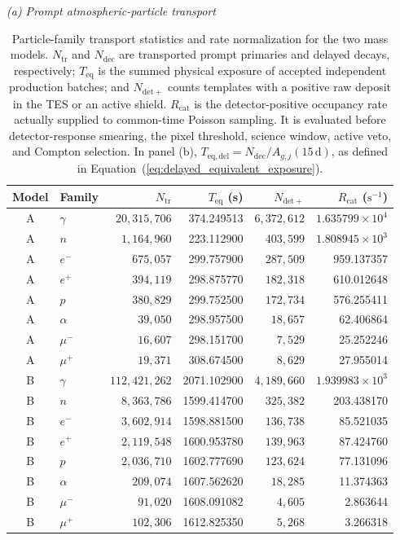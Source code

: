 \documentclass[11pt]{article}
\begin{document}
\begin{table}[!htbp]

\centering

\caption{Particle-family transport statistics and rate
normalization for the two mass models. $N_{\mathrm{tr}}$ and $N_{\mathrm{dec}}$
are transported prompt primaries and delayed decays, respectively;
$T_{\mathrm{eq}}$ is the summed physical exposure of accepted independent
production batches; and $N_{\mathrm{det+}}$ counts templates with a positive
raw deposit in the TES or an active shield. $R_{\mathrm{cat}}$ is the
detector-positive occupancy rate actually supplied to common-time Poisson
sampling. It is evaluated before detector-response smearing, the pixel
threshold, science window, active veto, and Compton selection. In panel (b),
$T_{\mathrm{eq,del}}=N_{\mathrm{dec}}/A_{g,j}(15\,\mathrm d)$, as defined in
Equation~(\ref{eq:delayed_equivalent_exposure}).}
\label{tab:background_source_model}
\scriptsize
\setlength{\tabcolsep}{5.0pt}
\renewcommand{\arraystretch}{0.92}
\noindent\textit{(a) Prompt atmospheric-particle transport}\par\vspace{0.20em}
\begin{tabular}{clrrrr}
\toprule
Model & Family & $N_{\mathrm{tr}}$ & $T_{\mathrm{eq}}$ (s)
& $N_{\mathrm{det+}}$ & $R_{\mathrm{cat}}$ ($\mathrm{s^{-1}}$) \\
\midrule
A & $\gamma$ & $20{,}315{,}706$ & 374.249513 & $6{,}372{,}612$ & $1.635799\times10^{4}$ \\
A & $n$ & $1{,}164{,}960$ & 223.112900 & $403{,}599$ & $1.808945\times10^{3}$ \\
A & $e^-$ & $675{,}057$ & 299.757900 & $287{,}509$ & 959.137357 \\
A & $e^+$ & $394{,}119$ & 298.875770 & $182{,}318$ & 610.012648 \\
A & $p$ & $380{,}829$ & 299.752500 & $172{,}734$ & 576.255411 \\
A & $\alpha$ & $39{,}050$ & 298.957500 & $18{,}657$ & 62.406864 \\
A & $\mu^-$ & $16{,}607$ & 298.151700 & $7{,}529$ & 25.252246 \\
A & $\mu^+$ & $19{,}371$ & 308.674500 & $8{,}629$ & 27.955014 \\
\addlinespace[0.25em]
B & $\gamma$ & $112{,}421{,}262$ & 2071.102900 & $4{,}189{,}660$ & $1.939983\times10^{3}$ \\
B & $n$ & $8{,}363{,}786$ & 1599.414700 & $325{,}382$ & 203.438170 \\
B & $e^-$ & $3{,}602{,}914$ & 1598.881500 & $136{,}738$ & 85.521035 \\
B & $e^+$ & $2{,}119{,}548$ & 1600.953780 & $139{,}963$ & 87.424760 \\
B & $p$ & $2{,}036{,}710$ & 1602.777690 & $123{,}624$ & 77.131096 \\
B & $\alpha$ & $209{,}074$ & 1607.562620 & $18{,}285$ & 11.374363 \\
B & $\mu^-$ & $91{,}020$ & 1608.091082 & $4{,}605$ & 2.863644 \\
B & $\mu^+$ & $102{,}306$ & 1612.825350 & $5{,}268$ & 3.266318 \\
\bottomrule
\end{tabular}


\end{table}
\end{document}
